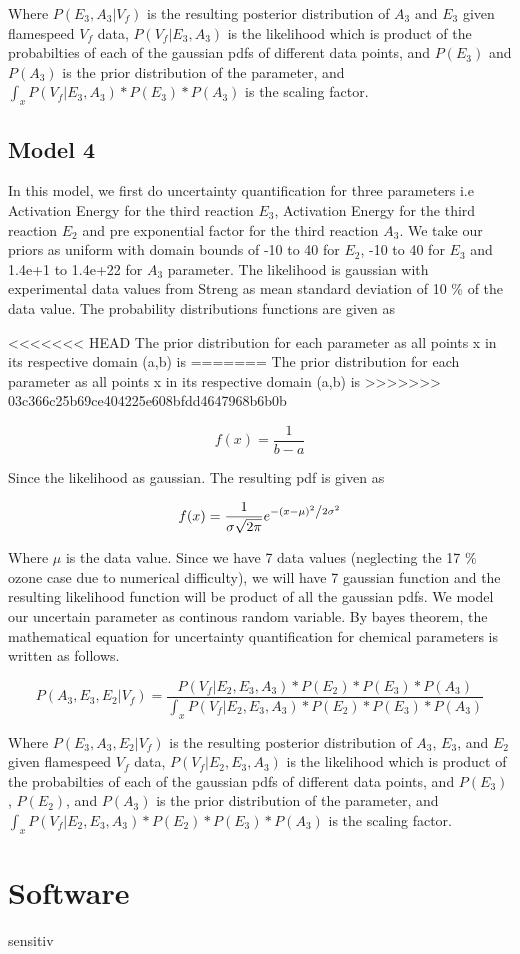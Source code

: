  \noindent Where  $P(E_3,A_3 |V_f)$ is the resulting posterior distribution of $A_3$ and $E_3$ given flamespeed $V_f$ data, $P(V_f| E_3 ,A_3)$ is the likelihood which is product of the probabilties of each of the gaussian pdfs of different data points, and $ P(E_3)$ and $P(A_3)$ is the prior distribution of the parameter, and $\int_x P(V_f|E_3,A_3)*P(E_3)*P(A_3)$ is the scaling factor.


\subsection{Model 4}


\noindent In this model, we first do uncertainty quantification for three parameters i.e Activation Energy for the third reaction $E_3$, Activation Energy for the third reaction $E_2$  and pre exponential factor for the third reaction $A_3$. We take our priors as uniform with domain bounds of -10 to 40 for $E_2$, -10 to 40 for $E_3$  and 1.4e+1 to 1.4e+22 for $A_3$  parameter. The likelihood is gaussian with experimental data values from Streng\cite{Streng} as mean standard deviation of 10 \% of the data value. The probability distributions functions are given as

<<<<<<< HEAD
\noindent The prior distribution for each parameter as all points x in its respective domain (a,b) is 
=======
\noindent The prior distribution for each parameter as all points x in its respective domain (a,b) is 
>>>>>>> 03c366c25b69ce404225e608bfdd4647968b6b0b

$$f(x) = \frac{1}{b -a}$$


\noindent Since the likelihood as gaussian. The resulting pdf is given as 

$$f(x) = \frac{1}{{\sigma \sqrt {2\pi } }}e^{{{ - \left( {x - \mu } \right)^2 } \mathord{\left/ {\vphantom {{ - \left( {x - \mu } \right)^2 } {2\sigma ^2 }}} \right. \kern-\nulldelimiterspace} {2\sigma ^2 }}} $$

  
\noindent Where $\mu$ is the data value. Since we have 7 data values (neglecting the 17 \% ozone case due to numerical difficulty), we will have 7 gaussian function and the resulting likelihood function will be product of all the gaussian pdfs. We model our uncertain parameter as continous random variable. By bayes theorem, the mathematical equation for uncertainty quantification for chemical parameters is written as follows. 

 $$P( A_3, E_3,E_2 |V_f ) = \frac{P(V_f| E_2,E_3,A_3)* P(E_2)*P(E_3)* P(A_3)}{\int_x P(V_f|E_2,E_3,A_3)* P(E_2)*P(E_3)*P(A_3)}$$ 
 
 \noindent Where  $P(E_3,A_3,E_2 |V_f)$ is the resulting posterior distribution of $A_3$, $E_3$,  and $E_2$ given flamespeed $V_f$ data, $P(V_f| E_2, E_3 ,A_3)$ is the likelihood which is product of the probabilties of each of the gaussian pdfs of different data points, and $P(E_3)$, $P(E_2)$, and $P(A_3)$ is the prior distribution of the parameter, and $\int_x P(V_f|E_2,E_3,A_3)* P(E_2)*P(E_3)*P(A_3)$ is the scaling factor.


\section{Software} sensitiv
